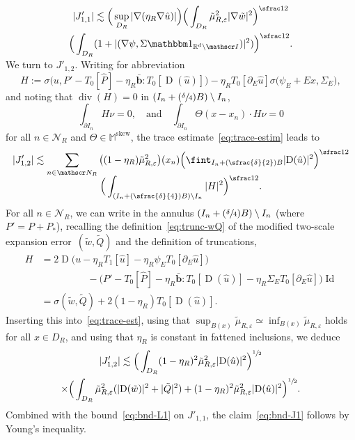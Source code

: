 \documentclass[10pt]{amsart}
\let\mathcal\mathscr
\newcommand{\Psfrac}[2]{(\sfrac{#1}{#2})}
\let\mathds\mathbbm
\theoremstyle{plain}
\theoremstyle{definition}
\newcommand{\e}{\varepsilon}
\newcommand{\R}{\mathbb R}
\newcommand{\Ic}{\mathcal I}
\newcommand{\Md}{\mathbb M}
\newcommand{\Nc}{\mathcal N}
\newcommand{\Id}{\operatorname{Id}}
\newcommand{\D}{\operatorname{D}}
\newcommand{\bb}{\bar{\boldsymbol b}}
\newcommand{\Div}{{\operatorname{div}}}
\newcommand{\Skew}{{\operatorname{skew}}}
\begin{document}
\begin{multline}\label{eq:bnd-L1}
|J'_{1,1}|\lesssim \Big(\sup_{D_R}|\nabla(\eta_R\nabla\hat u)|\Big)\Big(\int_{D_R}\tilde\mu_{R,\e}^2|\nabla\tilde w|^2\Big)^{\sfrac12}\\
\vspace*{-5pt}\Big(\int_{D_R}(1+|(\nabla\psi,\Sigma\mathds1_{\R^d\setminus\Ic})|^2)\Big)^{\sfrac12}.
\end{multline}
We turn to $J'_{1,2}$. Writing for abbreviation
\[H:=\sigma\big(u,P'-T_0[\hat P]-\eta_R\bb:T_0[\D(\hat u)]\big)-\eta_R T_0[\partial_E\hat u]\sigma(\psi_E+Ex,\Sigma_E\big),\]
and noting that $\Div(H)=0$ in $(I_n+\Psfrac\delta4B)\setminus I_n$,
\[
\int_{\partial I_n}H\nu=0, \quad\text{and}\quad \int_{\partial I_n}\Theta(x-x_n)\cdot H\nu=0
\]
for all $n\in\Nc_R$ and $\Theta\in\Md^\Skew$, the trace estimate~\eqref{eq:trace-estim} leads to
\begin{multline}\label{eq:trace-est}
|J'_{1,2}|\lesssim \sum_{n\in\Nc_R}\big((1-\eta_R)\tilde\mu_{R,\e}^2\big)(x_n)\Big(\fint_{I_n+\Psfrac\delta2 B}|\!\D(\hat u)|^2\Big)^{\sfrac12}\\[-5pt]
\Big(\int_{(I_n+\Psfrac\delta4B)\setminus I_n}|H|^2\Big)^{\sfrac12}.
\end{multline}
For all $n\in\Nc_R$, we can write in the annulus $(I_n+\Psfrac\delta4B)\setminus I_n$ (where $P'=P+P_*$), recalling the definition~\eqref{eq:trunc-wQ} of the modified two-scale expansion error~$(\tilde w,\tilde Q)$ and the definition of truncations,
\begin{align*}
H&= 2\D\!\big(u-\eta_RT_1[\hat u]-\eta_R\psi_ET_0[\partial_E\hat u]\big)\\
&\hspace{2cm}-\big(P'-T_0[\hat P]-\eta_R\bb:T_0[\D(\hat u)]-\eta_R\Sigma_ET_0[\partial_E\hat u]\big)\Id\\
&= \sigma(\tilde w,\tilde Q)+2(1-\eta_R)T_0[\D(\hat u)].
\end{align*}
Inserting this into~\eqref{eq:trace-est}, using that $\sup_{B(x)}\tilde\mu_{R,\e}\simeq\inf_{B(x)}\tilde\mu_{R,\e}$ holds for all $x\in D_R$, and using that $\eta_R$ is constant in fattened inclusions,
we deduce
\begin{multline*}
|J'_{1,2}|\lesssim \Big(\int_{D_R}(1-\eta_R)^2\tilde\mu_{R,\e}^2|\!\D(\hat u)|^2\Big)^{\sfrac12}\\
\times\Big(\int_{D_R}\tilde\mu_{R,\e}^2(|\!\D(\tilde w)|^2+|\tilde Q|^2)+(1-\eta_R)^2\tilde\mu_{R,\e}^2|\!\D(\hat u)|^2\Big)^{\sfrac12}.
\end{multline*}
Combined with the bound~\eqref{eq:bnd-L1} on $J'_{1,1}$, the claim~\eqref{eq:bnd-J1} follows by Young's inequality.
\end{document}
